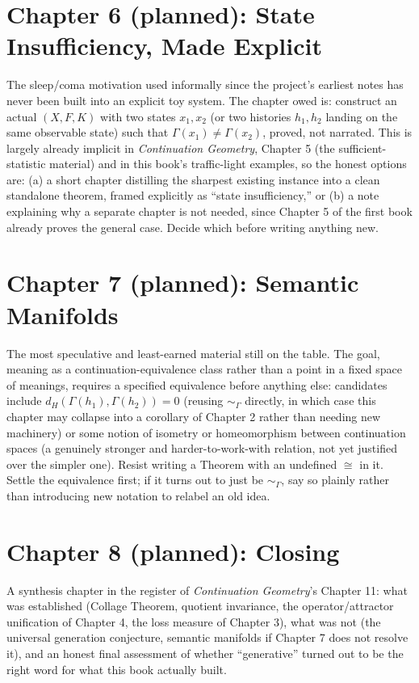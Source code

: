 \documentclass[11pt]{report}
\begin{document}
\section*{Chapter 6 (planned): State Insufficiency, Made Explicit}
The sleep/coma motivation used informally since the project's earliest
notes has never been built into an explicit toy system. The chapter
owed is: construct an actual $(X, F, K)$ with two states $x_1, x_2$
(or two histories $h_1, h_2$ landing on the same observable state)
such that $\Gamma(x_1) \neq \Gamma(x_2)$, proved, not narrated. This
is largely already implicit in \emph{Continuation Geometry}, Chapter
5 (the sufficient-statistic material) and in this book's traffic-light
examples, so the honest options are: (a) a short chapter distilling
the sharpest existing instance into a clean standalone theorem, framed
explicitly as ``state insufficiency,'' or (b) a note explaining why a
separate chapter is not needed, since Chapter 5 of the first book
already proves the general case. Decide which before writing anything
new.

\section*{Chapter 7 (planned): Semantic Manifolds}
The most speculative and least-earned material still on the table.
The goal, meaning as a continuation-equivalence class rather than a
point in a fixed space of meanings, requires a specified equivalence
before anything else: candidates include $d_H(\Gamma(h_1),
\Gamma(h_2)) = 0$ (reusing $\sim_\Gamma$ directly, in which case this
chapter may collapse into a corollary of Chapter 2 rather than needing
new machinery) or some notion of isometry or homeomorphism between
continuation spaces (a genuinely stronger and harder-to-work-with
relation, not yet justified over the simpler one). Resist writing a
Theorem with an undefined $\cong$ in it. Settle the equivalence first;
if it turns out to just be $\sim_\Gamma$, say so plainly rather than
introducing new notation to relabel an old idea.

\section*{Chapter 8 (planned): Closing}
A synthesis chapter in the register of \emph{Continuation Geometry}'s
Chapter 11: what was established (Collage Theorem, quotient
invariance, the operator/attractor unification of Chapter 4, the
loss measure of Chapter 3), what was not (the universal generation
conjecture, semantic manifolds if Chapter 7 does not resolve it), and
an honest final assessment of whether ``generative'' turned out to be
the right word for what this book actually built.
\end{document}
